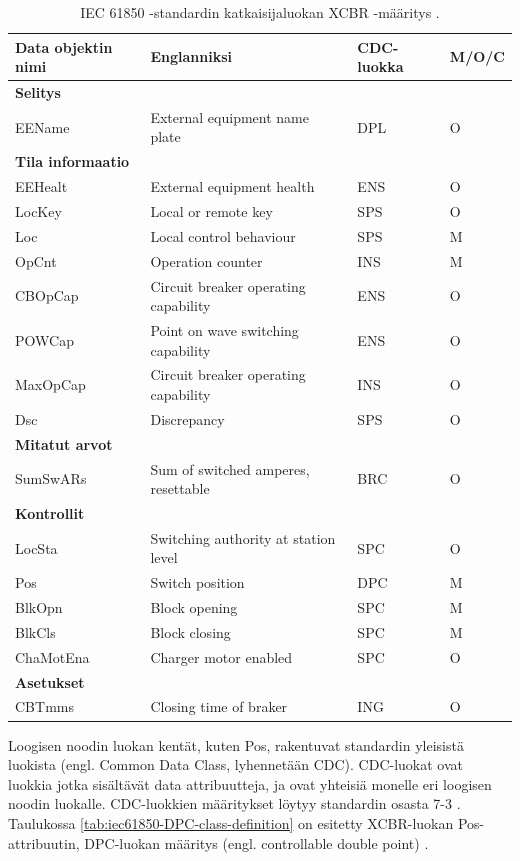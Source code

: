\begin{table}[ht!]
	\caption{IEC 61850 -standardin katkaisijaluokan XCBR -määritys \cite[s.~106]{IEC61850-7-4}.}
	\label{tab:iec61850-xcbr-class-definition}
	\begin{tabular}{l | l | l | l}
		\hline
		\textbf{Data objektin nimi} & \textbf{Englanniksi} & \textbf{CDC-luokka} & \textbf{M/O/C} \\
		\hline \hline
		\multicolumn{4}{l}{\textbf{Selitys}} \\
		\hline
		EEName & External equipment name plate & DPL & O \\
		\hline
		\multicolumn{4}{l}{\textbf{Tila informaatio}} \\
		\hline
		EEHealt & External equipment health & ENS & O \\
		LocKey & Local or remote key & SPS & O \\
		Loc & Local control behaviour & SPS & M \\
		OpCnt & Operation counter & INS & M \\
		CBOpCap & Circuit breaker operating capability & ENS & O \\
		POWCap & Point on wave switching capability & ENS & O \\
		MaxOpCap & Circuit breaker operating capability & INS & O \\
		Dsc & Discrepancy & SPS & O \\
		\hline
		\multicolumn{4}{l}{\textbf{Mitatut arvot}} \\
		\hline
		SumSwARs & Sum of switched amperes, resettable & BRC & O \\
		\hline
		\multicolumn{4}{l}{\textbf{Kontrollit}} \\
		\hline
		LocSta & Switching authority at station level & SPC & O \\
		Pos & Switch position & DPC & M \\
		BlkOpn & Block opening & SPC & M \\
		BlkCls & Block closing & SPC & M \\
		ChaMotEna & Charger motor enabled & SPC & O \\
		\hline
		\multicolumn{4}{l}{\textbf{Asetukset}} \\
		\hline
		CBTmms & Closing time of braker & ING & O \\
		\hline
	\end{tabular}
\end{table}

Loogisen noodin luokan kentät, kuten Pos, rakentuvat standardin yleisistä luokista (engl. Common Data Class, lyhennetään CDC). CDC-luokat ovat luokkia jotka sisältävät data attribuutteja, ja ovat yhteisiä monelle eri loogisen noodin luokalle. CDC-luokkien määritykset löytyy standardin osasta 7-3 \cite[s.~26]{IEC61850-1}. Taulukossa \ref{tab:iec61850-DPC-class-definition} on esitetty XCBR-luokan Pos-attribuutin, DPC-luokan määritys (engl. controllable double point) \cite[s.~44]{IEC61850-7-3}.


